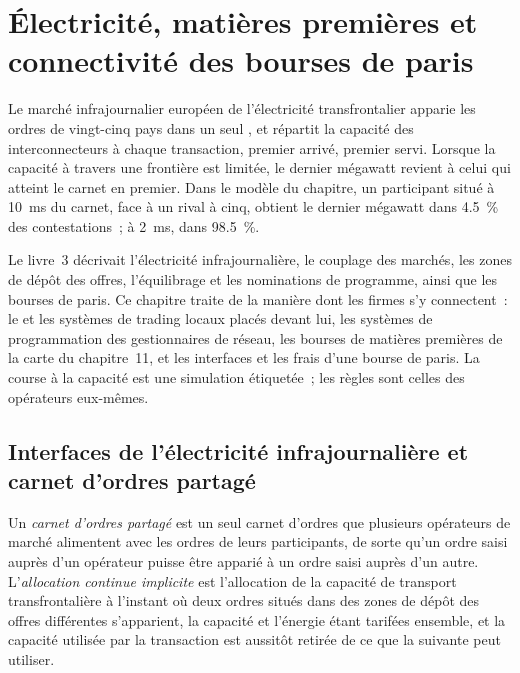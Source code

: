 \chapter{Électricité, matières premières et connectivité des bourses de paris}\label{ch:nw:power-commodities-and-betting-connectivity}

Le marché infrajournalier européen de l'électricité transfrontalier apparie les ordres de vingt-cinq pays dans un seul , et
répartit la capacité des interconnecteurs à chaque transaction, premier arrivé, premier servi. Lorsque la capacité à travers une frontière est limitée,
le dernier mégawatt revient à celui qui atteint le carnet en premier. Dans le modèle du chapitre, un participant situé à \qty{10}{\milli\second} du
carnet, face à un rival à cinq, obtient le dernier mégawatt dans 4.5~\% des contestations~; à \qty{2}{\milli\second}, dans 98.5~\%.

Le livre~3 décrivait l'électricité infrajournalière, le couplage des marchés, les zones de dépôt des offres, l'équilibrage et les nominations de programme, ainsi que les bourses de paris.
Ce chapitre traite de la manière dont les firmes s'y connectent~: le  et les systèmes de trading locaux placés devant lui, les
systèmes de programmation des gestionnaires de réseau, les bourses de matières premières de la carte du chapitre~11, et les interfaces et
les frais d'une bourse de paris. La course à la capacité est une simulation étiquetée~; les règles sont celles des opérateurs eux-mêmes.

\section{Interfaces de l'électricité infrajournalière et carnet d'ordres partagé}

\begin{definition}\label{def:nw:power-commodities-and-betting-connectivity:sob}
Un \emph{carnet d'ordres partagé} est un seul carnet d'ordres que plusieurs opérateurs de marché alimentent avec les ordres de leurs
participants, de sorte qu'un ordre saisi auprès d'un opérateur puisse être apparié à un ordre saisi auprès d'un autre.
L'\emph{allocation continue implicite} est l'allocation de la capacité de transport transfrontalière
à l'instant où deux ordres situés dans des zones de dépôt des offres différentes s'apparient, la capacité et l'énergie étant tarifées ensemble, et la
capacité utilisée par la transaction est aussitôt retirée de ce que la suivante peut utiliser.
\end{definition}

